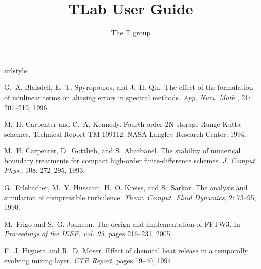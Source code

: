 \documentclass[a4paper,11pt]{book}
\title{{\bf T}\textcolor{black!50}{Lab} User Guide}
\author{The T group}
\begin{document}
\frontmatter
\pagestyle{empty}
\maketitle
\tableofcontents

\setlength{\parskip}{0.5\baselineskip}


\mainmatter
\pagestyle{fancy}









\backmatter


%
\begin{thebibliography}{20}
\providecommand{\natexlab}[1]{#1}
\providecommand{\url}[1]{\texttt{#1}}
\expandafter\ifx\csname urlstyle\endcsname\relax
  \providecommand{\doi}[1]{doi: #1}\else
  \providecommand{\doi}{doi: \begingroup \urlstyle{rm}\Url}\fi

G.~A. Blaisdell, E.~T. Spyropoulos, and J.~H. Qin.
\newblock The effect of the formulation of nonlinear terms on aliasing errors
  in spectral methods.
\newblock \emph{App. Num. Math.}, 21: 207--219, 1996.

M.~H. Carpenter and C.~A. Kennedy.
\newblock Fourth-order 2{N}-storage {R}unge-{K}utta schemes.
\newblock Technical Report TM-109112, NASA Langley Research Center, 1994.

M.~H. Carpenter, D.~Gottlieb, and S.~Abarbanel.
\newblock The stability of numerical boundary treatments for compact high-order
  finite-difference schemes.
\newblock \emph{J. Comput. Phys.}, 108: 272--295, 1993.

G.~Erlebacher, M.~Y. Hussaini, H.~O. Kreiss, and S.~Sarkar.
\newblock The analysis and simulation of compressible turbulence.
\newblock \emph{Theor. Comput. Fluid Dynamics}, 2: 73--95, 1990.

M.~Frigo and S.~G. Johnson.
\newblock The design and implementation of {FFTW3}.
\newblock In \emph{Proceedings of the {IEEE}, vol. 93}, pages 216--231, 2005.

F.~J. Higuera and R.~D. Moser.
\newblock Effect of chemical heat release in a temporally evolving mixing
  layer.
\newblock \emph{CTR Report}, pages 19--40, 1994.


\end{thebibliography}
\end{document}
